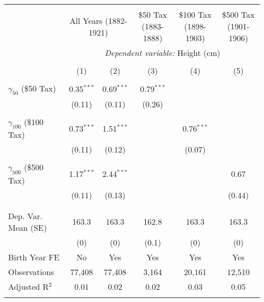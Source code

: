 
\begin{tabular}{@{\extracolsep{5pt}}lccccc} 
\\[-1.8ex]\hline 
\hline \\[-1.8ex] 
 & \multicolumn{2}{c}{All Years (1882-1921)} & \$50 Tax (1883-1888) & \$100 Tax (1898-1903) & \$500 Tax (1901-1906) \\ 
 & \multicolumn{5}{c}{\textit{Dependent variable:} Height (cm)} \\ 
\cline{2-6} 
\\[-1.8ex] & (1) & (2) & (3) & (4) & (5)\\ 
\hline \\[-1.8ex] 
 $\gamma_{50}$ (\$50 Tax) & 0.35$^{***}$ & 0.69$^{***}$ & 0.79$^{***}$ &  &  \\ 
  & (0.11) & (0.11) & (0.26) &  &  \\ 
  & & & & & \\ 
 $\gamma_{100}$ (\$100 Tax) & 0.73$^{***}$ & 1.51$^{***}$ &  & 0.76$^{***}$ &  \\ 
  & (0.11) & (0.12) &  & (0.07) &  \\ 
  & & & & & \\ 
 $\gamma_{500}$ (\$500 Tax) & 1.17$^{***}$ & 2.44$^{***}$ &  &  & 0.67 \\ 
  & (0.11) & (0.13) &  &  & (0.44) \\ 
  & & & & & \\ 
\hline \\[-1.8ex] 
Dep. Var. Mean (SE) & 163.3 & 163.3 & 162.8 & 163.3 & 163.3 \\ 
 & (0) & (0) & (0.1) & (0) & (0) \\ 
Birth Year FE & No & Yes & Yes & Yes & Yes \\ 
Observations & 77,408 & 77,408 & 3,164 & 20,161 & 12,510 \\ 
Adjusted R$^{2}$ & 0.01 & 0.02 & 0.02 & 0.03 & 0.05 \\ 
\hline 
\hline \\[-1.8ex] 
\end{tabular} 
